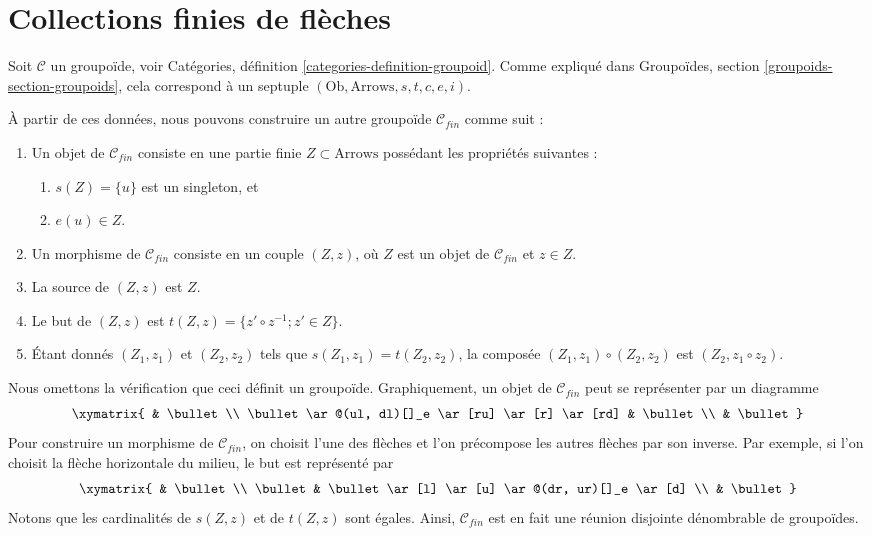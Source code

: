 \section{Collections finies de flèches}
\label{section-finite-set-arrows}

\noindent
Soit $\mathcal{C}$ un groupoïde, voir
Catégories, définition \ref{categories-definition-groupoid}.
Comme expliqué dans
Groupoïdes, section \ref{groupoids-section-groupoids},
cela correspond à un septuple $(\text{Ob}, \text{Arrows}, s, t, c, e, i)$.

\medskip\noindent
À partir de ces données, nous pouvons construire un autre groupoïde
$\mathcal{C}_{fin}$ comme suit :
\begin{enumerate}
\item Un objet de $\mathcal{C}_{fin}$ consiste en une partie finie
$Z \subset \text{Arrows}$ possédant les propriétés suivantes :
\begin{enumerate}
\item $s(Z) = \{u\}$ est un singleton, et
\item $e(u) \in Z$.
\end{enumerate}
\item Un morphisme de $\mathcal{C}_{fin}$ consiste en un couple
$(Z, z)$, où $Z$ est un objet de $\mathcal{C}_{fin}$ et
$z \in Z$.
\item La source de $(Z, z)$ est $Z$.
\item Le but de $(Z, z)$ est $t(Z, z) = \{z' \circ z^{-1}; z' \in Z\}$.
\item Étant donnés $(Z_1, z_1)$ et $(Z_2, z_2)$ tels que
$s(Z_1, z_1) = t(Z_2, z_2)$, la composée $(Z_1, z_1) \circ (Z_2, z_2)$ est $(Z_2, z_1 \circ z_2)$.
\end{enumerate}
Nous omettons la vérification que ceci définit un groupoïde.
Graphiquement, un objet de $\mathcal{C}_{fin}$ peut se représenter
par un diagramme
$$
\xymatrix{
& \bullet \\
\bullet \ar@(ul, dl)[]_e \ar[ru] \ar[r] \ar[rd] & \bullet \\
& \bullet
}
$$
Pour construire un morphisme de $\mathcal{C}_{fin}$, on choisit l'une des
flèches et l'on précompose les autres flèches par son inverse. Par exemple,
si l'on choisit la flèche horizontale du milieu, le but est représenté par
$$
\xymatrix{
& \bullet \\
\bullet & \bullet \ar[l] \ar[u] \ar@(dr, ur)[]_e \ar[d] \\
& \bullet
}
$$
Notons que les cardinalités de $s(Z, z)$ et de $t(Z, z)$ sont égales.
Ainsi, $\mathcal{C}_{fin}$ est en fait une réunion disjointe dénombrable
de groupoïdes.




